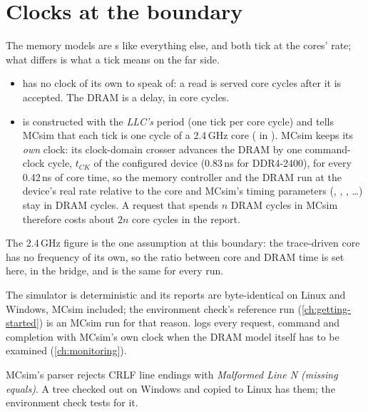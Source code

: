 \section{Clocks at the boundary}

The memory models are s like everything else, and both tick at the cores'
rate; what differs is what a tick means on the far side.

\begin{itemize}
\item {} has no clock of its own to speak of: a read is served
   core cycles after it is accepted. The DRAM is a delay, in core cycles.
\item {} is constructed with the \emph{LLC's} period (one tick per core
  cycle) and tells MCsim that each tick is one cycle of a 2.4\,GHz core
  ( in ). MCsim keeps its \emph{own} clock:
  its clock-domain crosser advances the DRAM by one command-clock cycle, $t_{CK}$ of the
  configured device (0.83\,ns for DDR4-2400), for every 0.42\,ns of core time, so the memory
  controller and the DRAM run at the device's real rate relative to the core and MCsim's timing
  parameters (, , , \ldots) stay in DRAM cycles. A request that
  spends $n$ DRAM cycles in MCsim therefore costs about $2n$ core cycles in the report.
\end{itemize}

The 2.4\,GHz figure is the one assumption at this boundary: the trace-driven core has no
frequency of its own, so the ratio between core and DRAM time is set here, in the bridge, and
is the same for every run.

The simulator is deterministic and its reports are byte-identical on Linux and Windows, MCsim
included; the environment check's reference run (\cref{ch:getting-started}) is an MCsim run for
that reason.  logs every request, command and completion with MCsim's own
clock when the DRAM model itself has to be examined (\cref{ch:monitoring}).

\begin{trapbox}
MCsim's  parser rejects CRLF line endings with \emph{Malformed Line N (missing
equals)}. A tree checked out on Windows and copied to Linux has them; the environment check
tests for it.
\end{trapbox}

